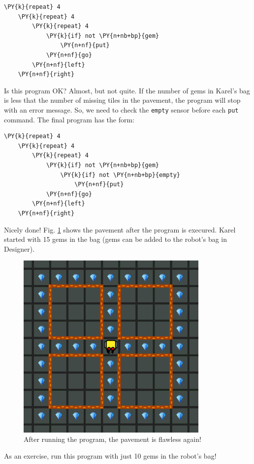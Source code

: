 \begin{bbox}
\begin{Verbatim}[commandchars=\\\{\}]
\PY{k}{repeat} 4
    \PY{k}{repeat} 4
        \PY{k}{repeat} 4
            \PY{k}{if} not \PY{n+nb+bp}{gem}
                \PY{n+nf}{put}
            \PY{n+nf}{go}
        \PY{n+nf}{left}
    \PY{n+nf}{right}
\end{Verbatim}
\end{bbox}
\vspace{6mm}

\noindent
Is this program OK? Almost, but not quite. If the number of
gems in Karel's bag is less that the number of missing tiles
in the pavement, the program will stop with an error message. 
So, we need to check the {\tt empty} sensor before each {\tt put}
command. The final program has the form:\\

\begin{bbox}
\begin{Verbatim}[commandchars=\\\{\}]
\PY{k}{repeat} 4
    \PY{k}{repeat} 4
        \PY{k}{repeat} 4
            \PY{k}{if} not \PY{n+nb+bp}{gem}
                \PY{k}{if} not \PY{n+nb+bp}{empty}
                    \PY{n+nf}{put}
            \PY{n+nf}{go}
        \PY{n+nf}{left}
    \PY{n+nf}{right}
\end{Verbatim}
\end{bbox}
\vspace{6mm}

\noindent
Nicely done! Fig. \ref{fig:empty-112} shows the pavement after the program 
is execured. Karel started with 15 gems in the bag (gems can be added to 
the robot's bag in Designer).

\begin{figure}[!ht]
\begin{center}
\includegraphics[width=9.4cm]{img/empty-112.png}
\vspace{-0mm}
\caption{After running the program, the pavement is flawless again!}
\label{fig:empty-112}
\end{center}
\end{figure}
\noindent
As an exercise, run this program with just 10 gems in the robot's bag!
\newpage

